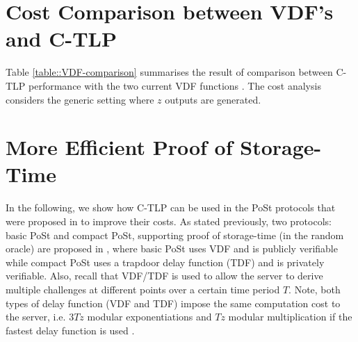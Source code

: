 

\section{Cost Comparison between VDF’s and C-TLP}\label{table-VDF-cost-comparison}

Table \ref{table::VDF-comparison}  summarises the result of comparison between C-TLP performance with the two current VDF functions \cite{Wesolowski19,BonehBBF18}. The cost analysis considers the generic setting where $z$ outputs are generated. 



\section{More Efficient Proof of Storage-Time}\label{More-Efficient-Proof-of-Storage-Time}

In the following, we show how C-TLP can be used in the PoSt protocols that were proposed in  \cite{Storage-Time} to improve their costs. As stated previously,  two protocols: basic PoSt and compact PoSt, supporting proof of storage-time (in the random oracle) are proposed in \cite{Storage-Time}, where  basic PoSt uses VDF and is publicly verifiable while compact PoSt  uses a trapdoor delay function (TDF) and is privately verifiable. Also, recall that VDF/TDF is used to allow the server to derive multiple challenges at different points over a certain time period $T$. Note, both types of delay function (VDF and TDF) impose the same computation cost to the server, i.e. $3Tz$ modular exponentiations and $Tz$ modular multiplication if the fastest delay function is used \cite{Wesolowski19}. 

